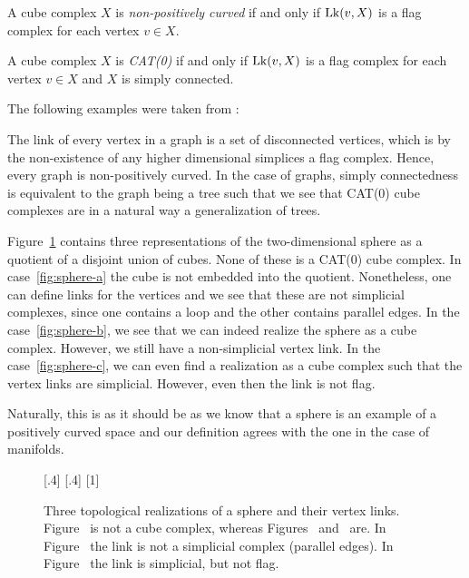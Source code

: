 \begin{thm}
  \label{thm:link}
  A cube complex \(X\) is \emph{non-positively curved} if and only if \(\operatorname{Lk}(v,X)\) is a flag complex for each vertex \(v \in X\).

  A cube complex \(X\) is \emph{CAT(0)} if and only if \(\operatorname{Lk}(v,X)\)  is a flag complex for each vertex \(v \in X\) and \(X\) is simply connected.
\end{thm}

The following examples were taken from \textcite{sageev-lecture-notes}:
\begin{bsp}[Graphs]
  \label{bsp:ccc-graph}
  The link of every vertex in a graph is a set of disconnected vertices, which is by the non-existence of any higher dimensional simplices a flag complex. Hence, every graph is non-positively curved. In the case of graphs, simply connectedness is equivalent to the graph being a tree such that we see that CAT(0) cube complexes are in a natural way a generalization of trees.
\end{bsp}
\begin{bsp}[Sphere]
  \label{bsp:ccc-sphere}
  Figure~\ref{fig:sphere} contains three representations of the two-dimensional sphere as a quotient of a disjoint union of cubes. None of these is a CAT(0) cube complex. In case~\ref{fig:sphere-a} the cube is not embedded  into the quotient. Nonetheless, one can define links for the vertices and we see that these are not simplicial complexes, since one contains a loop and the other contains parallel edges. In the case~\ref{fig:sphere-b}, we see that we can indeed realize the sphere as a cube complex. However, we still have a non-simplicial vertex link. In the case~\ref{fig:sphere-c}, we can even find a realization as a cube complex such that the vertex links are simplicial. However, even then the link is not flag.

  Naturally, this is as it should be as we know that a sphere is an example of a positively curved space and our definition agrees with the one in the case of manifolds.
  \begin{figure}[htbp]
    \centering
    \subcaptionbox{\label{fig:sphere-a}}[.4\linewidth]{}%
    \subcaptionbox{\label{fig:sphere-b}}[.4\linewidth]{}
    \subcaptionbox{\label{fig:sphere-c}}[1\linewidth]{}%
    \caption{Three topological realizations of a sphere and their vertex links. Figure~ is not a cube complex, whereas Figures~ and~ are. In Figure~ the link is not a simplicial complex (parallel edges). In Figure~ the link is simplicial, but not flag.}
    \label{fig:sphere}
  \end{figure}
\end{bsp}
